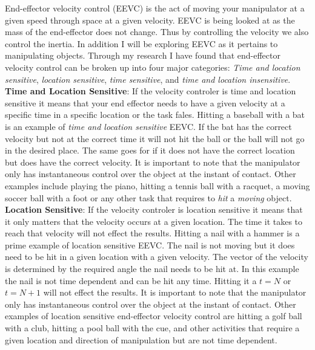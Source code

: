 End-effector velocity control (EEVC) is the act of moving your manipulator at a given speed through space at a given velocity.
EEVC is being looked at as the mass of the end-effector does not change.
Thus by controlling the velocity we also control the inertia.
In addition I will be exploring EEVC as it pertains to manipulating objects.
Through my research I have found that end-effector velocity control can be broken up into four major categories:
\textit{Time and location sensitive}, \textit{location sensitive}, \textit{time sensitive}, and \textit{time and location insensitive}.\\


\noindent \textbf{Time and Location Sensitive}: 
If the velocity controler is time and location sensitive it means that your end effector needs to have a given velocity at a specific time in a specific location or the task fales.
Hitting a baseball with a bat is an example of \textit{time and location sensitive}  EEVC.
If the bat has the correct velocity but not at the correct time it will not hit the ball or the ball will not go in the desired place.  
The same goes for if it does not have the correct location but does have the correct velocity.
It is important to note that the manipulator only has instantaneous control over the object at the instant of contact.
Other examples include playing the piano, hitting a tennis ball with a racquet, a moving soccer ball with a foot or any other task that requires to \textit{hit} a \textit{moving} object.\\


\noindent \textbf{Location Sensitive}:
If the velocity controler is location sensitive it means that it only matters that the velocity occurs at a given location.
The time it takes to reach that velocity will not effect the results.
Hitting a nail with a hammer is a prime example of location sensitive EEVC.  
The nail is not moving but it does need to be hit in a given location with a given velocity.
The vector of the velocity is determined by the required angle the nail needs to be hit at.
In this example the nail is not time dependent and can be hit any time.
Hitting it a $t=N$ or $t=N+1$ will not effect the results.
It is important to note that the manipulator only has instantaneous control over the object at the instant of contact.
Other examples of location sensitive end-effector velocity control are hitting a golf ball with a club, hitting a pool ball with the cue, and other activities that require a given location and direction of manipulation but are not time dependent.\\


